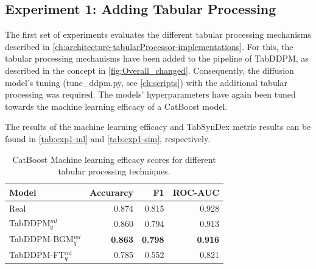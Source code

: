 \subsection{Experiment 1: Adding Tabular Processing}
\label{ch:Experiment-1}

The first set of experiments evaluates the different tabular processing mechanisms described in \autoref{ch:architecture-tabularProcessor-implementations}.
For this, the tabular processing mechanisms have been added to the pipeline of TabDDPM, as described in the concept in \autoref{fig:Overall_changed}.
Consequently, the diffusion model's tuning (tune\_ddpm.py, see \autoref{ch:scripts}) with the additional tabular processing was required.
The models' hyperparameters have again been tuned towards the machine learning efficacy of a CatBoost model.

The results of the machine learning efficacy and TabSynDex metric results can be found in \autoref{tab:exp1-ml} and \autoref{tab:exp1-sim}, respectively.
\begin{table}[h]
	\centering
	\begin{tabular}{lrrr}
		\toprule
		\textbf{Model}         & \textbf{Accurarcy} & \textbf{F1}    & \textbf{ROC-AUC} \\
		\midrule
		Real                   & 0.874              & 0.815          & 0.928            \\
		TabDDPM$^{ml}_{q}$     & 0.860              & 0.794          & 0.913            \\
		TabDDPM-BGM$^{ml}_{q}$ & \textbf{0.863}     & \textbf{0.798} & \textbf{0.916}   \\
		TabDDPM-FT$^{ml}_{q}$  & 0.785              & 0.552          & 0.821            \\
		\bottomrule
	\end{tabular}
	\caption[Experiment1-ML-Efficacy]{CatBoost Machine learning efficacy scores for different tabular processing techniques.}
	\label{tab:exp1-ml}
\end{table}

